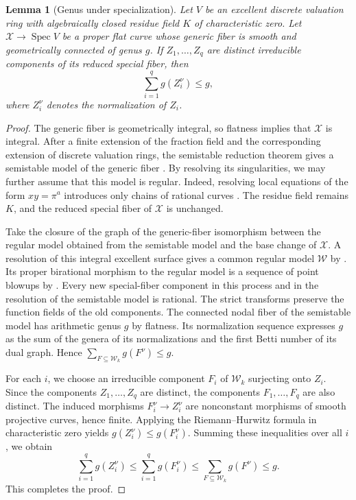 \documentclass[12pt]{amsart}
\numberwithin{equation}{section}
\newtheorem{lemma}[theorem]{Lemma}
\theoremstyle{definition}
\theoremstyle{remark}
\numberwithin{equation}{section}
\begin{document}
\begin{lemma}[Genus under specialization]\label{lem:genus-specialization}
	Let $V$ be an excellent discrete valuation ring with algebraically  closed residue field $K$ of characteristic zero. Let
	$\mathcal X\to\operatorname{Spec}V$ be a proper flat curve whose  generic fiber is smooth and geometrically connected of genus $g$.
	If $Z_1,\ldots,Z_q$ are distinct irreducible components of its reduced special fiber, then
	\[
	\sum_{i=1}^q g(Z_i^\nu)\le g,
	\]
	where $Z_i^\nu$ denotes the normalization of $Z_i$.
\end{lemma}
\begin{proof}
	The generic fiber is geometrically integral, so flatness implies that $\mathcal X$ is integral. After a finite extension of the fraction field and the corresponding  extension of discrete valuation rings, the semistable reduction theorem gives  a semistable model of the generic fiber
	\cite[Tag~0CDN]{Stacks}. By resolving its singularities, we may further assume that this model is regular. Indeed, resolving local equations of the
		form $xy=\pi^a$ introduces only chains of rational curves  \cite[Tag~0CDC]{Stacks}. The residue field remains $K$, and the reduced special fiber of $\mathcal X$ is unchanged.

Take the closure of the graph of the generic-fiber isomorphism between the regular model obtained from the semistable model and the base change of $\mathcal X$. A resolution of this integral excellent surface gives a common regular model $\mathcal W$ by \cite[Tag~0BGP]{Stacks}. Its proper birational morphism to the regular model is a sequence of point blowups by \cite[Tag~0C5R]{Stacks}. Every new special-fiber component in this process and in the resolution of the semistable model is rational. The strict transforms preserve the function fields of the old components. The connected nodal fiber of the semistable model has arithmetic genus $g$ by flatness. Its normalization sequence expresses $g$ as the sum of the genera of its normalizations and the first Betti number of its dual graph. Hence $\sum_{F\subseteq\mathcal W_k}g(F^\nu)\le g$.

	For each $i$,  we choose an irreducible component $F_i$ of $\mathcal W_k$	surjecting onto $Z_i$.
Since the components $Z_1,\ldots,Z_q$ are distinct, the components $F_1,\ldots,F_q$ are also distinct.	The induced morphisms
$F_i^\nu\longrightarrow Z_i^\nu$	are nonconstant  morphisms of smooth projective curves, hence finite.	Applying the Riemann--Hurwitz formula in characteristic zero yields $g(Z_i^\nu)\le g(F_i^\nu)$. Summing these inequalities over all $i$, we obtain
	\[
	\sum_{i=1}^q g(Z_i^\nu)
	\le \sum_{i=1}^q g(F_i^\nu)
	\le \sum_{F\subseteq\mathcal W_k}g(F^\nu)
	\le g.
	\]
	This completes the proof.
\end{proof}
\end{document}
